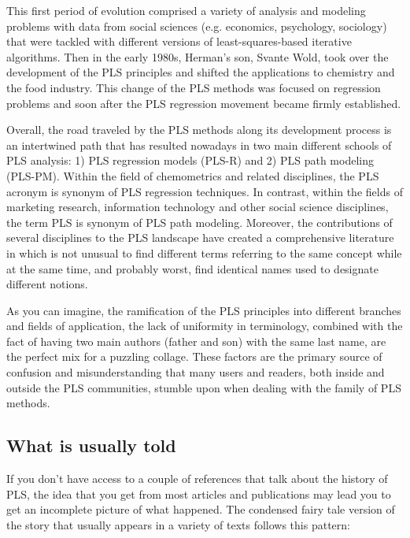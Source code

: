 \documentclass[12pt]{book}\usepackage{graphicx, color}
\begin{document}
This first period of evolution comprised a variety of analysis and modeling problems with data from social sciences (e.g. economics, psychology, sociology) that were tackled with different versions of least-squares-based iterative algorithms. Then in the early 1980s, Herman's son, Svante Wold, took over the development of the PLS principles and shifted the applications to chemistry and the food industry. This change of the PLS methods was focused on regression problems and soon after the PLS regression movement became firmly established. 

Overall, the road traveled by the PLS methods along its development process is an intertwined path that has resulted nowadays in two main different schools of PLS analysis: 1) PLS regression models (PLS-R) and 2) PLS path modeling (PLS-PM). Within the field of chemometrics and related disciplines, the PLS acronym is synonym of PLS regression techniques. In contrast, within the fields of marketing research, information technology and other social science disciplines, the term PLS is synonym of PLS path modeling. Moreover, the contributions of several disciplines to the PLS landscape have created a comprehensive literature in which is not unusual to find different terms referring to the same concept while at the same time, and probably worst, find identical names used to designate different notions. 

As you can imagine, the ramification of the PLS principles into different branches and fields of application, the lack of uniformity in terminology, combined with the fact of having two main authors (father and son) with the same last name, are the perfect mix for a puzzling collage. These factors are the primary source of confusion and misunderstanding that many users and readers, both inside and outside the PLS communities, stumble upon when dealing with the family of PLS methods. 


\subsection*{What is usually told}
If you don't have access to a couple of references that talk about the history of PLS, the idea that you get from most articles and publications may lead you to get an incomplete picture of what happened. The condensed fairy tale version of the story that usually appears in a variety of texts follows this pattern:
\end{document}

